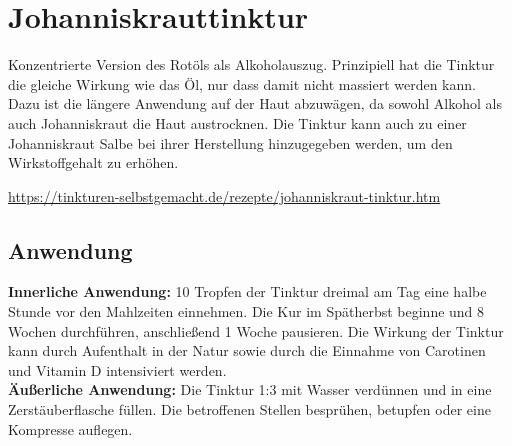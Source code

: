 


\newpage


\section{Johanniskrauttinktur}
\label{   }

Konzentrierte Version des Rotöls als Alkoholauszug. Prinzipiell hat die Tinktur die gleiche Wirkung wie das Öl, nur dass damit nicht massiert werden kann. Dazu ist die längere Anwendung auf der Haut abzuwägen, da sowohl Alkohol als auch Johanniskraut die Haut austrocknen. Die Tinktur kann auch zu einer Johanniskraut Salbe bei ihrer Herstellung hinzugegeben werden, um den Wirkstoffgehalt zu erhöhen.

\cite{tinkturen} \cite{nedoma2018heiltinkturen}

\url{https://tinkturen-selbstgemacht.de/rezepte/johanniskraut-tinktur.htm}

     
               

\subsection{Anwendung}

\textbf{Innerliche Anwendung:} 10 Tropfen der Tinktur dreimal am Tag eine halbe Stunde vor den Mahlzeiten einnehmen. Die Kur im Spätherbst beginne und 8 Wochen durchführen, anschließend 1 Woche pausieren. Die Wirkung der Tinktur kann durch Aufenthalt in der Natur sowie durch die Einnahme von Carotinen und Vitamin D intensiviert werden.\\

\textbf{Äußerliche Anwendung:} Die Tinktur 1:3 mit Wasser verdünnen und in eine Zerstäuberflasche füllen. Die betroffenen Stellen besprühen, betupfen oder eine Kompresse auflegen.\\

